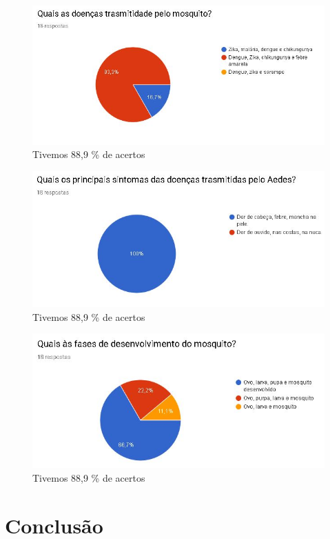 \documentclass[12pt]{article}
\begin{document}
		\begin{figure}
			\centering
			\caption{Tivemos 88,9 \% de acertos}
			\includegraphics[width=0.7\linewidth]{Figuras/Pergunta_3}
			
			\label{fig:pergunta3}
		\end{figure}
	
		\begin{figure}
			\centering
			\caption{Tivemos 88,9 \% de acertos}
			\includegraphics[width=0.7\linewidth]{Figuras/Pergunta_4}
			
			\label{fig:pergunta4}
		\end{figure}
	
		\begin{figure}
			\centering
			\caption{Tivemos 88,9 \% de acertos}
			\includegraphics[width=0.7\linewidth]{Figuras/Pergunta_5}
			
			\label{fig:pergunta5}
		\end{figure}
	
	
	\section{Conclusão}%
\end{document}
